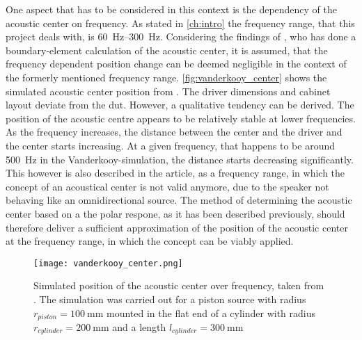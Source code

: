 One aspect that has to be considered in this context is the dependency of the acoustic center on frequency. As stated in \autoref{ch:intro} the frequency range, that this project deals with, is \SIrange{60}{300}{\hertz}. Considering the findings of \citep{vanderkooy10}, who has done a boundary-element calculation of the acoustic center, it is assumed, that the frequency dependent position change can be deemed  negligible in the context of the formerly mentioned frequency range. 
\autoref{fig:vanderkooy_center} shows the simulated acoustic center position from \citep{vanderkooy10}. The driver dimensions and cabinet layout deviate from the \gls{dut}. However, a qualitative tendency can be derived. The position of the acoustic centre appears to be relatively stable at lower frequencies. As the frequency increases, the distance between the center and the driver and the center starts increasing. At a given frequency, that happens to be around \SI{500}{\hertz} in the Vanderkooy-simulation, the distance starts decreasing significantly. This however is also described in the article, as a frequency range, in which the concept of an acoustical center is not valid anymore, due to the speaker not behaving like an omnidirectional source. The method of determining the acoustic center based on a the polar respone, as it has been described previously, should therefore deliver a sufficient approximation of the position of the acoustic center at the frequency range, in which the concept can be viably applied.
\begin{figure}[htbp]
	\centering
	\texttt{[image: vanderkooy\_center.png]}
	\caption{Simulated position of the acoustic center over frequency, taken from \citep{vanderkooy10}. The simulation was carried out for a piston source with radius $r_{piston} = \SI{100}{\milli\meter}$ mounted in the flat end of a cylinder with radius $r_{cylinder} = \SI{200}{\milli\meter}$ and a length $l_{cylinder} = \SI{300}{\milli\meter}$}

		\label{fig:vanderkooy_center}
\end{figure}


